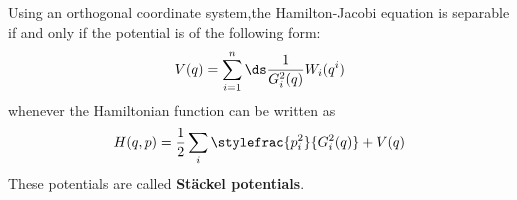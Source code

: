 	\begin{theorem}
		Using an orthogonal coordinate system,\newline the Hamilton-Jacobi equation is separable if and only if the potential is of the following form:
		\begin{equation}
			\label{lagrange:stackel_condition}
			V(q) = \sum_{i=1}^n\ds\frac{1}{G_i^2(q)}W_i(q^i)
		\end{equation}
		whenever the Hamiltonian function can be written as
		\begin{equation}
			H(q, p) = \frac{1}{2}\sum_i\stylefrac{p_i^2}{G^2_i(q)} + V(q)
		\end{equation}
		These potentials are called \textbf{St\"ackel potentials}.
	\end{theorem}
